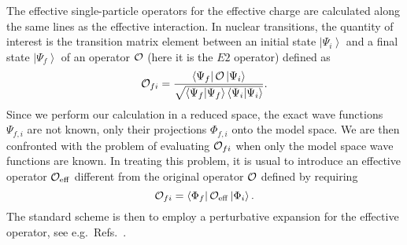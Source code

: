 The effective single-particle operators for the effective charge 
are calculated along the same lines  
as the effective interaction. In   
nuclear transitions, the quantity of 
interest is the transition matrix element between an initial state 
$\left|\Psi_i\right\rangle$ and a final state $\left|\Psi_f\right\rangle$ 
of an operator ${\cal O}$ (here it is the $E2$ operator) defined as 
\begin{equation} 
               {\cal O}_{fi}= 
               \frac{\left\langle\Psi_f\right| 
               {\cal O}\left|\Psi_i\right\rangle } 
               {\sqrt{\left\langle\Psi_f | \Psi_f \right\rangle 
               \left\langle \Psi_i | \Psi_i \right\rangle}}. 
               \label{eq:effop1} 
\end{equation} 
Since we perform our calculation in a reduced space, the exact 
wave functions $\Psi_{f,i}$ are not known, only their 
projections $\Phi_{f,i}$ onto the model space. We are then confronted with the 
problem of evaluating ${\cal O}_{fi}$ when only the model 
space wave functions are known. In treating this problem, it is usual 
to introduce an effective operator 
${\cal O}_{\mathrm{eff}}$ different from the original operator ${\cal O}$ 
defined by requiring 
\begin{equation} 
           {\cal O}_{fi}=\left\langle\Phi_f\right |{\cal O}_{\mathrm{eff}} 
           \left|\Phi_i\right\rangle. 
\end{equation} 
The standard 
scheme is then to employ a  
perturbative expansion for the effective operator, see e.g.\ Refs.\  
\cite{towner87,eo77,kren77}. 
 

